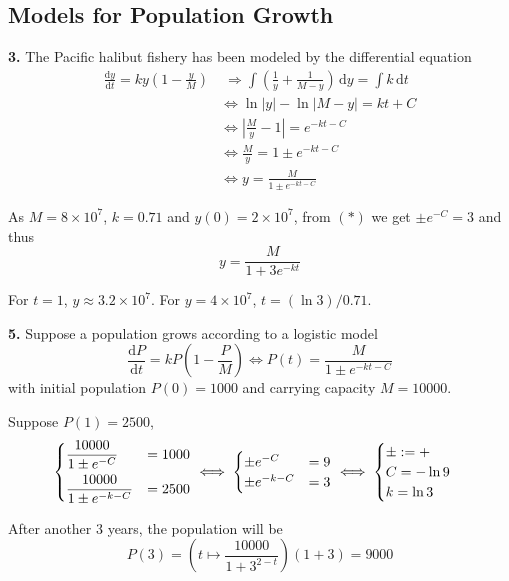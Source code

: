 \documentclass[a4paper,12pt]{article}
\newcommand{\ud}{\,\mathrm{d}}
\newcommand{\leibniz}[3][]{\frac{\mathrm{d} #1 #2}{\mathrm{d} #3 #1}}
\begin{document}
\subsection{Models for Population Growth}
\textbf{3.} The Pacific halibut fishery has been modeled
by the differential equation
\begin{align*}
  \leibniz{y}{t} = ky\left(1 - \frac{y}{M}\right)
  &\;\Longrightarrow \int\left(\frac{1}{y} + \frac{1}{M-y}\right)\ud y
  = \int k\ud t\\
  &\iff \ln|y| - \ln|M - y| = kt + C\\
  &\iff \left|\frac{M}{y} - 1\right| = e^{-kt-C}\\
  &\iff \frac{M}{y} = 1 \pm e^{-kt-C}\\
  &\iff y = \frac{M}{1 \pm e^{-kt-C}}
  \tag{$*$}
\end{align*}

As $M = 8\times 10^7$, $k = 0.71$ and $y(0) = 2\times 10^7$,
from $(*)$ we get $\pm e^{-C} = 3$ and thus
\[y = \frac{M}{1 + 3e^{-kt}}\]

For $t = 1$, $y \approx 3.2\times 10^7$.
For $y = 4\times 10^7$, $t = (\ln 3)/0.71$.

\noindent\textbf{5.} Suppose a population grows according to a logistic model
\[\leibniz{P}{t} = kP\left(1 - \frac{P}{M}\right)
\iff P(t) = \frac{M}{1 \pm e^{-kt-C}}\]
with initial population $P(0) = 1000$ and carrying capacity $M = 10000$.

Suppose $P(1) = 2500$,
\[\begin{dcases}
  \frac{10000}{1\pm e^{-C}} &= 1000\\
  \frac{10000}{1\pm e^{-k-C}} &= 2500
\end{dcases}
\iff\begin{cases}
  \pm e^{-C} &= 9\\
  \pm e^{-k-C} &= 3
\end{cases}
\iff\begin{cases}
  \pm := +\\
  C = -\ln 9\\
  k = \ln 3
\end{cases}\]

After another 3 years, the population will be
\[P(3) = \left(t\mapsto\frac{10000}{1+3^{2-t}}\right)(1+3) = 9000\]
\end{document}
